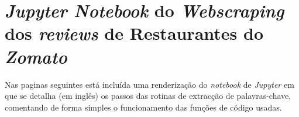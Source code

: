 \chapter{\textit{Jupyter Notebook} do \textit{Webscraping} dos \textit{reviews} de Restaurantes do \textit{Zomato}}
\label{ap5}


Nas paginas seguintes está incluída uma renderização do \textit{notebook} de \textit{Jupyter} em que se detalha (em inglês) os passos das rotinas de extracção de palavras-chave, comentando de forma simples o funcionamento das funções de código usadas.

